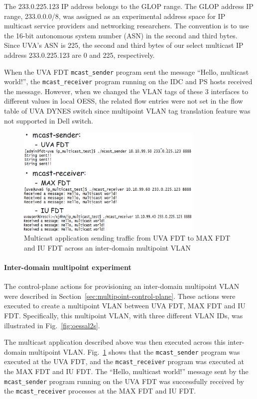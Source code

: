 The 233.0.225.123 IP address belongs to the 
GLOP range. The GLOP address IP range, 233.0.0.0/8, was assigned as an experimental address space for IP multicast service providers and networking researchers. The convention is to use the 16-bit autonomous system number (ASN)
in the second and third bytes. Since UVA's ASN is 225, the second and third bytes of our select multicast IP address 233.0.225.123 are 0 and 225, respectively.  

When the UVA FDT \texttt{mcast\_sender} program sent the message ``Hello, multicast world!'', the
\texttt{mcast\_receiver}  program running on the IDC and PS hosts received the message. However, when we changed the VLAN tags of these 3 interfaces to different values in local OESS, the related flow entries were not set in the flow table of UVA DYNES switch since multipoint VLAN tag translation feature was not supported in Dell  switch.
\begin{figure}[htb!]
\centering
\includegraphics[width=0.8\textwidth]{figures/AL2Smulticast.png}
\caption{Multicast application sending traffic from UVA FDT to MAX FDT and IU FDT across an inter-domain multipoint VLAN}
\label{fig:widemulticast}
\end{figure}

\paragraph{Inter-domain multipoint experiment}
The control-plane actions for provisioning an inter-domain multipoint VLAN  were described in Section~\ref{sec:multipoint-control-plane}. These actions were executed to create a multipoint VLAN
between UVA FDT, MAX FDT and IU FDT. Specifically, this multipoint VLAN, with three different VLAN IDs, was illustrated
in Fig.~\ref{fig:oessal2s}.

The multicast application described above was then executed across this inter-domain multipoint VLAN. Fig.~\ref{fig:widemulticast} shows that the \texttt{mcast\_sender} program was executed at the UVA FDT,
and the \texttt{mcast\_receiver} program was executed at the MAX FDT and IU FDT. The ``Hello, multicast world!''
message sent by the \texttt{mcast\_sender} program running on the UVA FDT was successfully received by the 
\texttt{mcast\_receiver} processes at the MAX FDT and IU FDT.

